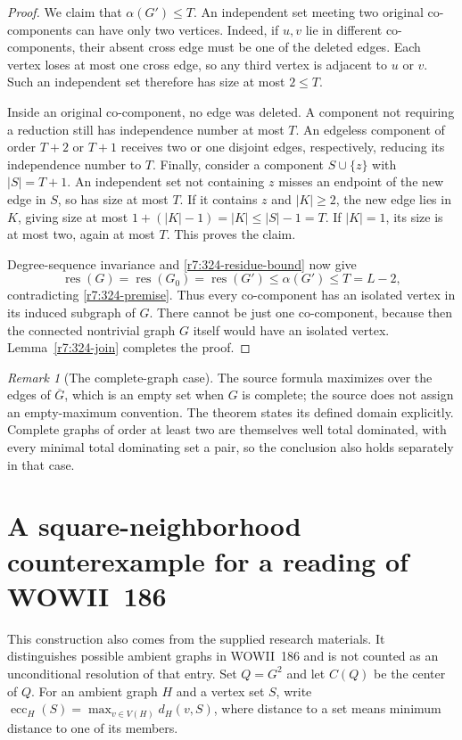 \documentclass[11pt,a4paper]{article}
\theoremstyle{remark}
\newtheorem{remark}[theorem]{Remark}
\begin{document}
\begin{proof}
We claim that $\alpha(G')\le T$.  An independent set meeting two
original co-components can have only two vertices.  Indeed, if
$u,v$ lie in different co-components, their absent cross edge must
be one of the deleted edges.  Each vertex loses at most one cross
edge, so any third vertex is adjacent to $u$ or $v$.  Such an
independent set therefore has size at most $2\le T$.

Inside an original co-component, no edge was deleted.  A component
not requiring a reduction still has independence number at most
$T$.  An edgeless component of order $T+2$ or $T+1$ receives two or
one disjoint edges, respectively, reducing its independence number
to $T$.  Finally, consider a component $S\cup\{z\}$ with
$|S|=T+1$.  An independent set not containing $z$ misses an endpoint
of the new edge in $S$, so has size at most $T$.  If it contains
$z$ and $|K|\ge2$, the new edge lies in $K$, giving size at most
$1+(|K|-1)=|K|\le|S|-1=T$.  If $|K|=1$, its size is at most
two, again at most $T$.  This proves the claim.

Degree-sequence invariance and \eqref{r7:324-residue-bound} now give
\[
 \operatorname{res}(G)=\operatorname{res}(G_0)
   =\operatorname{res}(G')\le\alpha(G')\le T=L-2,
\]
contradicting \eqref{r7:324-premise}.
Thus every co-component has an isolated vertex in its induced
subgraph of $G$.  There cannot be just one co-component, because
then the connected nontrivial graph $G$ itself would have an
isolated vertex.  Lemma~\ref{r7:324-join} completes the proof.
\end{proof}

\begin{remark}[The complete-graph case]
\label{r7:324-domain}
The source formula maximizes over the edges of $\overline G$, which
is an empty set when $G$ is complete; the source does not assign an
empty-maximum convention.  The theorem states its defined domain
explicitly.  Complete graphs of order at least two are themselves
well total dominated, with every minimal total dominating set a
pair, so the conclusion also holds separately in that case.
\end{remark}

\section{A square-neighborhood counterexample for a reading of WOWII~186}
\label{r7leaf:sec186}

This construction also comes from the supplied research materials.
It distinguishes possible ambient graphs in WOWII~186 and is not counted
as an unconditional resolution of that entry.  Set $Q=G^2$ and let $C(Q)$
be the center of $Q$.  For an ambient graph $H$ and a vertex set $S$, write
$\operatorname{ecc}_H(S)=\max_{v\in V(H)}d_H(v,S)$, where distance to a set
means minimum distance to one of its members.
\end{document}
